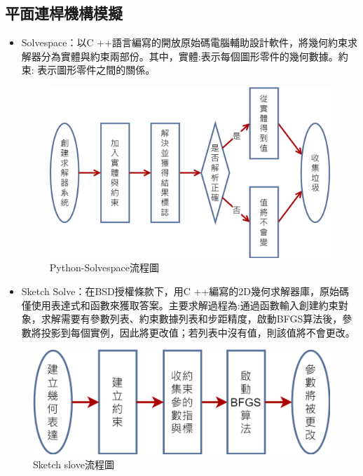 \documentclass[14pt,a4paper]{report}  %
\begin{document}
{    	
      \subsection{平面連桿機構模擬}
      \begin{itemize} 
      \item Solvespace：以C ++語言編寫的開放原始碼電腦輔助設計軟件，將幾何約束求解器分為實體與約束兩部份。其中，實體:表示每個圖形零件的幾何數據。約束: 表示圖形零件之間的關係。

		\begin{figure}[H]
        \centering
        \includegraphics[scale=0.25]{Python-Solvespace求解流程.png} 
        \caption{Python-Solvespace流程圖} 
        \label{fig:scale}
    	\end{figure}
    	
      \item Sketch Solve：在BSD授權條款下，用C ++編寫的2D幾何求解器庫，原始碼僅使用表達式和函數來獲取答案。主要求解過程為:通過函數輸入創建約束對象，求解需要有參數列表、約束數據列表和步距精度，啟動BFGS算法後，參數將投影到每個實例，因此將更改值；若列表中沒有值，則該值將不會更改。
      	\end{itemize} 
      	
		\begin{figure}[H]
        \centering
        \includegraphics[scale=0.3]{Sketch slove.png} 
        \caption{Sketch slove流程圖} 
        \label{fig:scale}
    	\end{figure}
    	
}
\end{document}
